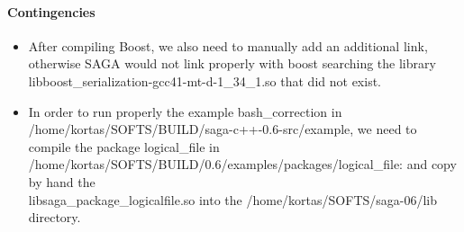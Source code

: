 \paragraph{Contingencies}
\label{api:contingencies}
\begin{itemize}
 \item After  compiling Boost, we also need to manually add an additional link,
      otherwise SAGA would not link properly with boost searching the
      library libboost\_serialization-gcc41-mt-d-1\_34\_1.so that
      did not exist.
 \item In order to run properly the example bash\_correction in \\
       /home/kortas/SOFTS/BUILD/saga-c++-0.6-src/example, we need to
       compile the package logical\_file in \\
       /home/kortas/SOFTS/BUILD/0.6/examples/packages/logical\_file:
       and copy by hand the \\
       libsaga\_package\_logicalfile.so into
       the /home/kortas/SOFTS/saga-06/lib directory.
\end{itemize}

